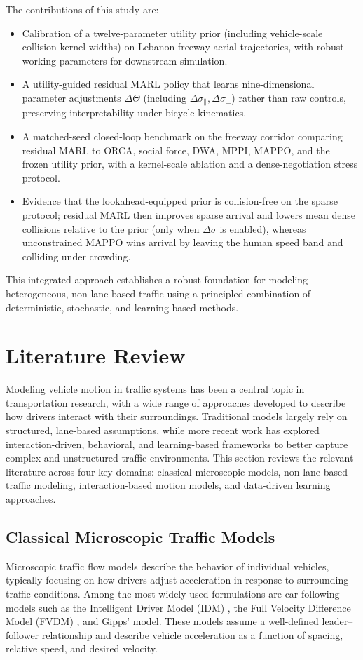 \documentclass[conference]{IEEEtran}
\begin{document}
The contributions of this study are:
\begin{itemize}
    \item Calibration of a twelve-parameter utility prior (including vehicle-scale collision-kernel widths) on Lebanon freeway aerial trajectories, with robust working parameters for downstream simulation.
    \item A utility-guided residual MARL policy that learns nine-dimensional parameter adjustments $\Delta\Theta$ (including $\Delta\sigma_{\parallel},\Delta\sigma_{\perp}$) rather than raw controls, preserving interpretability under bicycle kinematics.
    \item A matched-seed closed-loop benchmark on the freeway corridor comparing residual MARL to ORCA, social force, DWA, MPPI, MAPPO, and the frozen utility prior, with a kernel-scale ablation and a dense-negotiation stress protocol.
    \item Evidence that the lookahead-equipped prior is collision-free on the sparse protocol; residual MARL then improves sparse arrival and lowers mean dense collisions relative to the prior (only when $\Delta\sigma$ is enabled), whereas unconstrained MAPPO wins arrival by leaving the human speed band and colliding under crowding.
\end{itemize}

This integrated approach establishes a robust foundation for modeling heterogeneous, non-lane-based traffic using a principled combination of deterministic, stochastic, and learning-based methods.

\section{Literature Review}
\label{lit_review}

Modeling vehicle motion in traffic systems has been a central topic in transportation research, with a wide range of approaches developed to describe how drivers interact with their surroundings. Traditional models largely rely on structured, lane-based assumptions, while more recent work has explored interaction-driven, behavioral, and learning-based frameworks to better capture complex and unstructured traffic environments. This section reviews the relevant literature across four key domains: classical microscopic models, non-lane-based traffic modeling, interaction-based motion models, and data-driven learning approaches.

\subsection{Classical Microscopic Traffic Models}
Microscopic traffic flow models describe the behavior of individual vehicles, typically focusing on how drivers adjust acceleration in response to surrounding traffic conditions. Among the most widely used formulations are car-following models such as the Intelligent Driver Model (IDM) \cite{treiber2000congested, treiber2013traffic}, the Full Velocity Difference Model (FVDM) \cite{bando1995dynamical}, and Gipps’ model. These models assume a well-defined leader--follower relationship and describe vehicle acceleration as a function of spacing, relative speed, and desired velocity.
\end{document}
